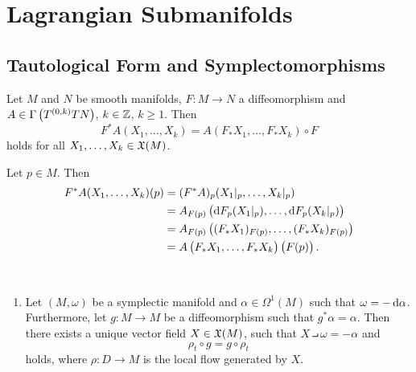 \chapter{Lagrangian Submanifolds}
\section{Tautological Form and Symplectomorphisms}
\begin{exercise}
Let $M$ and $N$ be smooth manifolds, $F : M \to N$ a diffeomorphism and $A \in \Gamma\del[1]{T^{(0,k)}TN}$, $k \in \mathbb{Z}$, $k \geq 1$. Then 
\begin{equation}
F^*A(X_1,\dots,X_k) = A(F_*X_1,\dots,F_*X_k) \circ F
\end{equation}
\noindent holds for all $X_1,\dots,X_k \in \mathfrak{X}(M)$.
\label{ex_properties_pullback}
\end{exercise}

\begin{solution}
Let $p \in M$. Then
\begin{align*}
F^*A(X_1,\dots,X_k)(p) &= (F^*A)_p(X_1\vert_p,\dots,X_k\vert_p)\\
&= A_{F(p)}\del[1]{\d F_p(X_1\vert_p),\dots,\d F_p(X_k\vert_p)}\\
&= A_{F(p)}\del[1]{(F_*X_1)_{F(p)},\dots,(F_*X_k)_{F(p)}}\\
&= A\del[1]{F_*X_1,\dots,F_*X_k}\del[1]{F(p)}.
\end{align*}
\end{solution}

\begin{exercise}
~
\begin{enumerate}[label = \textup{(}\alph*\textup{)}]
\item Let $(M,\omega)$ be a symplectic manifold and $\alpha \in \Omega^1(M)$ such that $\omega = -\mathop{}\!\mathrm{d} \alpha$. Furthermore, let $g : M \to M$ be a diffeomorphism such that $g^*\alpha = \alpha$. Then there exists a unique vector field $X \in \mathfrak{X}(M)$, such that $X \intprod \omega = -\alpha$ and
\begin{equation}
\rho_t \circ g = g \circ \rho_t
\end{equation}
\noindent holds, where $\rho : D \to M$ is the local flow generated by $X$.
\end{enumerate}
\end{exercise}

